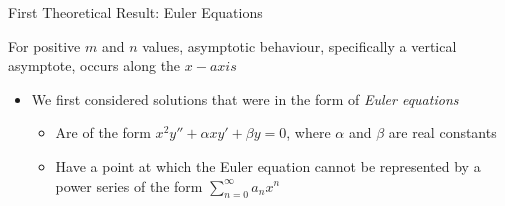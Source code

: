 \documentclass{beamer}
\begin{document}
\begin{frame}{First Theoretical Result: Euler Equations}

\vspace*{-10mm}

\begin{center}

\begin{observation}

For positive $m$ and $n$ values, asymptotic behaviour, specifically a vertical asymptote, occurs along the $x-axis$
 
\end{observation}

\end{center}

\vspace*{-5mm}

\begin{itemize}

\item We first considered solutions that were in the form of \textit{Euler equations}

\begin{itemize}

\item Are of the form $x^2y''+\alpha xy'+\beta y=0$, where $\alpha$ and $\beta$ are real constants

\item Have a point at which the Euler equation cannot be represented by a power series of the form $\sum_{n=0}^{\infty} a_{n} x^n$

\end{itemize}

\end{itemize}

\end{frame}
\end{document}
